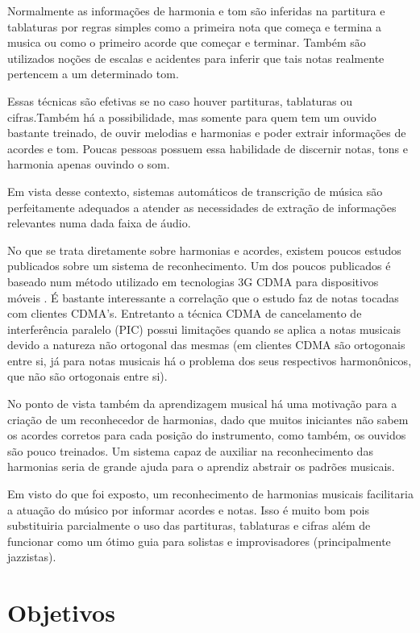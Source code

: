 Normalmente as informações de harmonia e tom são inferidas na partitura e tablaturas por regras simples como a primeira nota que começa e termina a musica ou como o primeiro acorde que começar e terminar. Também são utilizados noções de escalas e acidentes para inferir que tais notas realmente pertencem a um determinado tom.

Essas técnicas são efetivas se no caso houver partituras, tablaturas ou cifras.Também há a possibilidade, mas somente para quem tem um ouvido bastante treinado, de ouvir melodias e harmonias e poder extrair informações de acordes e tom. Poucas pessoas possuem essa habilidade de discernir notas, tons e harmonia apenas ouvindo o som.

Em vista desse contexto, sistemas automáticos de transcrição de música \cite{automaticmusic} são perfeitamente adequados a atender as necessidades de extração de informações relevantes numa dada faixa de áudio.

No que se trata diretamente sobre harmonias e acordes, existem poucos estudos publicados sobre um sistema de reconhecimento. Um dos poucos publicados é baseado num método utilizado em tecnologias 3G CDMA para dispositivos móveis \cite{picchords}. É bastante interessante a correlação que o estudo faz de notas tocadas com clientes CDMA's. Entretanto a técnica CDMA de cancelamento de interferência paralelo (PIC) possui limitações quando se aplica a notas musicais devido a natureza não ortogonal das mesmas (em clientes CDMA são ortogonais entre si, já para notas musicais há o problema dos seus respectivos harmonônicos, que não são ortogonais entre si).

No ponto de vista também da aprendizagem musical há uma motivação para a criação de um reconhecedor de harmonias, dado que muitos iniciantes não sabem os acordes corretos para cada posição do instrumento, como também, os ouvidos são pouco treinados. Um sistema capaz de auxiliar na reconhecimento das harmonias seria de grande ajuda para o aprendiz abstrair os padrões musicais.

Em visto do que foi exposto, um reconhecimento de harmonias musicais facilitaria a atuação do músico por informar acordes e notas. Isso é muito bom pois substituiria parcialmente o uso das partituras, tablaturas e cifras além de funcionar como um ótimo guia para solistas e improvisadores (principalmente jazzistas).

\section{Objetivos}
\label{sec:objetivos}

